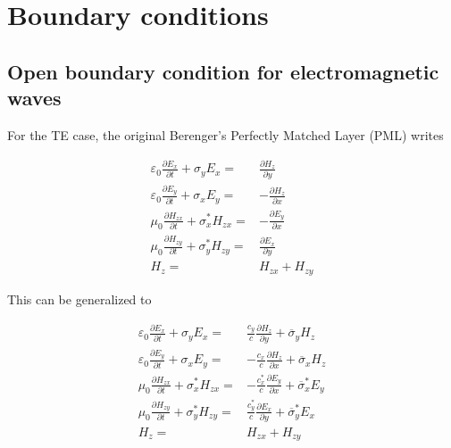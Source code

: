 

\section{Boundary conditions}

\subsection{Open boundary condition for electromagnetic waves}

For the TE case, the original Berenger's Perfectly Matched Layer (PML) writes

\begin{eqnarray}
\varepsilon _{0}\frac{\partial E_{x}}{\partial t}+\sigma _{y}E_{x} = & \frac{\partial H_{z}}{\partial y}\label{PML_def_1} \\
\varepsilon _{0}\frac{\partial E_{y}}{\partial t}+\sigma _{x}E_{y} = & -\frac{\partial H_{z}}{\partial x}\label{PML_def_2} \\
\mu _{0}\frac{\partial H_{zx}}{\partial t}+\sigma ^{*}_{x}H_{zx} = & -\frac{\partial E_{y}}{\partial x}\label{PML_def_3} \\
\mu _{0}\frac{\partial H_{zy}}{\partial t}+\sigma ^{*}_{y}H_{zy} = & \frac{\partial E_{x}}{\partial y}\label{PML_def_4} \\
H_{z}  = & H_{zx}+H_{zy}\label{PML_def_5}
\end{eqnarray}

This can be generalized to

\begin{eqnarray}
\varepsilon _{0}\frac{\partial E_{x}}{\partial t}+\sigma _{y}E_{x} = & \frac{c_{y}}{c}\frac{\partial H_{z}}{\partial y}+\overline{\sigma }_{y}H_{z}\label{APML_def_1} \\
\varepsilon _{0}\frac{\partial E_{y}}{\partial t}+\sigma _{x}E_{y} = & -\frac{c_{x}}{c}\frac{\partial H_{z}}{\partial x}+\overline{\sigma }_{x}H_{z}\label{APML_def_2} \\
\mu _{0}\frac{\partial H_{zx}}{\partial t}+\sigma ^{*}_{x}H_{zx} = & -\frac{c^{*}_{x}}{c}\frac{\partial E_{y}}{\partial x}+\overline{\sigma }_{x}^{*}E_{y}\label{APML_def_3} \\
\mu _{0}\frac{\partial H_{zy}}{\partial t}+\sigma ^{*}_{y}H_{zy} = & \frac{c^{*}_{y}}{c}\frac{\partial E_{x}}{\partial y}+\overline{\sigma }_{y}^{*}E_{x}\label{APML_def_4} \\
H_{z} = & H_{zx}+H_{zy}\label{APML_def_5}
\end{eqnarray}

